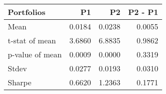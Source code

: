 \begin{tabular}{lrrr}
\toprule
Portfolios & P1 & P2 & P2 - P1 \\
\midrule
Mean & 0.0184 & 0.0238 & 0.0055 \\
t-stat of mean & 3.6860 & 6.8835 & 0.9862 \\
p-value of mean & 0.0009 & 0.0000 & 0.3319 \\
Stdev & 0.0277 & 0.0193 & 0.0310 \\
Sharpe & 0.6620 & 1.2363 & 0.1771 \\
\bottomrule
\end{tabular}
